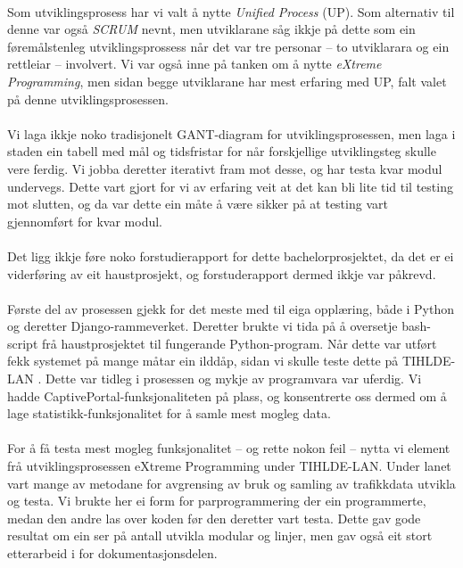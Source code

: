 \documentclass[nynorsk,12pt,a4paper,oneside]{book}
\begin{document}
\paragraph{}
Som utviklingsprosess har vi valt å nytte \emph{Unified Process} (UP). Som alternativ til denne var også \emph{SCRUM} nevnt, men utviklarane såg ikkje på dette som ein føremålstenleg utviklingsprossess når det var tre personar -- to utviklarara og ein rettleiar -- involvert. Vi var også inne på tanken om å nytte \emph{eXtreme Programming}, men sidan begge utviklarane har mest erfaring med UP, falt valet på denne utviklingsprosessen.
\paragraph{}
Vi laga ikkje noko tradisjonelt GANT-diagram for utviklingsprosessen, men laga i staden ein tabell med mål og tidsfristar for når forskjellige utviklingsteg skulle vere ferdig. Vi jobba deretter iterativt fram mot desse, og har testa kvar modul undervegs. Dette vart gjort for vi av erfaring veit at det kan bli lite tid til testing mot slutten, og da var dette ein måte å være sikker på at testing vart gjennomført for kvar modul. 
\paragraph{}
Det ligg ikkje føre noko forstudierapport for dette bachelorprosjektet, da det er ei viderføring av eit haustprosjekt, og forstuderapport dermed ikkje var påkrevd. 
\paragraph{}
Første del av prosessen gjekk for det meste med til eiga opplæring, både i Python og deretter Django-rammeverket. Deretter brukte vi tida på å oversetje bash-script frå haustprosjektet til fungerande Python-program. Når dette var utført fekk systemet på mange måtar ein ilddåp, sidan vi skulle teste dette på TIHLDE-LAN . Dette var tidleg i prosessen og mykje av programvara var uferdig. Vi hadde CaptivePortal-funksjonaliteten på plass, og konsentrerte oss dermed om å lage statistikk-funksjonalitet for å samle mest mogleg data.
\paragraph{}
For å få testa mest mogleg funksjonalitet -- og rette nokon feil -- nytta vi element frå utviklingsprosessen eXtreme Programming under TIHLDE-LAN. Under lanet vart mange av metodane for avgrensing av bruk og samling av trafikkdata utvikla og testa. Vi brukte her ei form for parprogrammering der ein programmerte, medan den andre las over koden før den deretter vart testa. Dette gav gode resultat om ein ser på antall utvikla modular og linjer, men gav også eit stort etterarbeid i for dokumentasjonsdelen.
\end{document}
